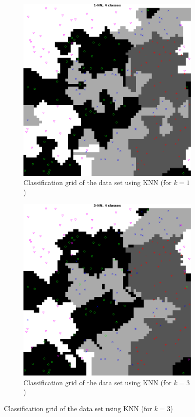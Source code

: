 \documentclass[10pt]{article}
\begin{document}
\begin{figure}[H]
  \centering
  \begin{subfigure}{.48\textwidth}
    \includegraphics[width=.8\linewidth]{assign2_4_1.png}
    \caption{Classification grid of the data set using KNN (for $k=1$)}
    \label{fig2.4a}
  \end{subfigure}
  \begin{subfigure}{.48\textwidth}
    \includegraphics[width=.8\linewidth]{assign2_4_3.png}
    \caption{Classification grid of the data set using KNN (for $k=3$)}
    \label{fig2.4b}
  \end{subfigure}

\end{figure}
\end{document}

